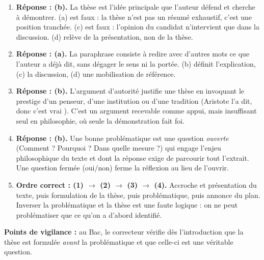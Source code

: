 \documentclass[11pt]{article}
\begin{document}
\begin{exoresolu}
\begin{enumerate}
\item \textbf{Réponse : (b).} La thèse est l'idée principale que l'auteur défend et cherche à démontrer. (a) est faux : la thèse n'est pas un résumé exhaustif, c'est une position tranchée. (c) est faux : l'opinion du candidat n'intervient que dans la discussion. (d) relève de la présentation, non de la thèse.
\item \textbf{Réponse : (a).} La paraphrase consiste à redire avec d'autres mots ce que l'auteur a déjà dit, sans dégager le sens ni la portée. (b) définit l'explication, (c) la discussion, (d) une mobilisation de référence.
\item \textbf{Réponse : (b).} L'argument d'autorité justifie une thèse en invoquant le prestige d'un penseur, d'une institution ou d'une tradition (\og Aristote l'a dit, donc c'est vrai \fg). C'est un argument recevable comme appui, mais insuffisant seul en philosophie, où seule la démonstration fait foi.
\item \textbf{Réponse : (b).} Une bonne problématique est une question \emph{ouverte} (Comment ? Pourquoi ? Dans quelle mesure ?) qui engage l'enjeu philosophique du texte et dont la réponse exige de parcourir tout l'extrait. Une question fermée (oui/non) ferme la réflexion au lieu de l'ouvrir.
\item \textbf{Ordre correct : (1) $\rightarrow$ (2) $\rightarrow$ (3) $\rightarrow$ (4).} Accroche et présentation du texte, puis formulation de la thèse, puis problématique, puis annonce du plan. Inverser la problématique et la thèse est une faute logique : on ne peut problématiser que ce qu'on a d'abord identifié.
\end{enumerate}
\textbf{Points de vigilance :} au Bac, le correcteur vérifie dès l'introduction que la thèse est formulée \emph{avant} la problématique et que celle-ci est une véritable question.
\end{exoresolu}
\end{document}
